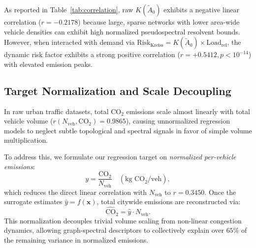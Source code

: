 \documentclass[journal]{IEEEtran}
\begin{document}
\begin{table}[htbp]
\caption{Statistical Correlation of Top Graph-Spectral Descriptors with Normalized Emissions}
\label{tab:correlation}
\centering
{}
\end{table}

As reported in Table~\ref{tab:correlation}, raw $K(\tilde{A}_0)$ exhibits a negative linear correlation ($r = -0.2178$) because large, sparse networks with lower area-wide vehicle densities can exhibit high normalized pseudospectral resolvent bounds. However, when interacted with demand via $\text{Risk}_{\text{Kreiss}} = K(\tilde{A}_0) \times \text{Load}_{\text{rel}}$, the dynamic risk factor exhibits a strong positive correlation ($r = +0.5412, p < 10^{-14}$) with elevated emission peaks.

\subsection{Target Normalization and Scale Decoupling}
In raw urban traffic datasets, total $\text{CO}_2$ emissions scale almost linearly with total vehicle volume ($r(N_{\text{veh}}, \text{CO}_2) = 0.9865$), causing unnormalized regression models to neglect subtle topological and spectral signals in favor of simple volume multiplication.

To address this, we formulate our regression target on \emph{normalized per-vehicle emissions}:
\begin{equation}
y = \frac{\text{CO}_2}{N_{\text{veh}}} \quad (\text{kg CO}_2 / \text{veh}),
\end{equation}
which reduces the direct linear correlation with $N_{\text{veh}}$ to $r = 0.3450$. Once the surrogate estimates $\hat{y} = f(\mathbf{x})$, total citywide emissions are reconstructed via:
\begin{equation}
\widehat{\text{CO}}_2 = \hat{y} \cdot N_{\text{veh}}.
\end{equation}
This normalization decouples trivial volume scaling from non-linear congestion dynamics, allowing graph-spectral descriptors to collectively explain over $65\%$ of the remaining variance in normalized emissions.
\end{document}

